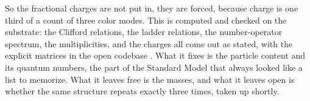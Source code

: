 So the fractional charges are not put in, they are forced, because charge is one third of a count of three color modes.
This is computed and checked on the substrate: the Clifford relations, the ladder relations, the number-operator
spectrum, the multiplicities, and the charges all come out as stated, with the explicit matrices in the open codebase \cite{cluesurf2026repo}. What it fixes is the particle content and its
quantum numbers, the part of the Standard Model that always looked like a list to memorize. What it leaves free is the
masses, and what it leaves open is whether the same structure repeats exactly three times, taken up shortly.
